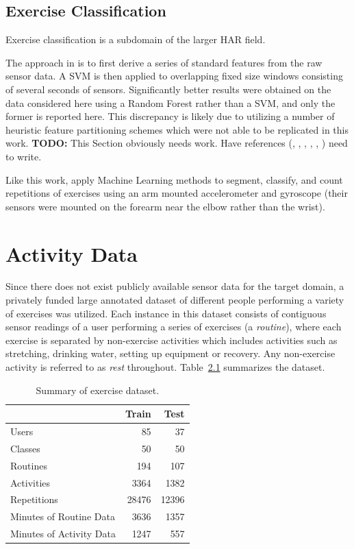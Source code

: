\documentclass[12pt]{report}
\newcommand{\1}[0]{\mathbbm{1}}
\begin{document}
\section{Exercise Classification}
Exercise classification is a subdomain of the larger \ac{HAR} field.

The approach in \cite{ms-activity} is to first derive a series of
standard features from the raw sensor data. A \ac{SVM} is then applied to overlapping
fixed size windows consisting of several seconds of sensors. Significantly better results were
obtained on the data considered here using a Random Forest rather than a \ac{SVM},
and only the former is reported here. This discrepancy is likely due to \cite{ms-activity}
utilizing a number of heuristic feature partitioning schemes which were not able to be replicated in this work.
\textbf{TODO:} This Section obviously needs work. Have references
(\cite{ms-overview},
\cite{arm-worn-muehlbauer},
\cite{phone-kwapisz},
\cite{weka-aaai-ravi},
\cite{multiple-sensor-bao},
\cite{taylor-crbm-2006}) need to write.

Like this work, \cite{ms-activity} apply Machine Learning methods to segment, classify, and count repetitions
of exercises using an arm mounted accelerometer and gyroscope (their sensors were mounted on the forearm
near the elbow rather than the wrist).

\chapter{Activity Data}
\label{chap:Activity Data}
Since there does not exist publicly available sensor data for the target domain, a privately funded
large annotated dataset of different people performing a variety of exercises was utilized.
Each instance in this dataset consists of contiguous sensor readings of a user performing a
series of exercises (a \emph{routine}), where each exercise is separated by non-exercise activities
which includes activities such as stretching, drinking water, setting up  equipment or recovery.
Any non-exercise activity is referred to as \emph{rest} throughout. Table~\ref{table:dataset} summarizes
the dataset.

\begin{table}[ht]
    \centering
    \begin{tabular}{l r r}\hline
    & \textbf{Train} &\textbf{Test} \\\hline
    Users & 85 & 37\\
    Classes & 50 & 50\\
    Routines & 194 & 107\\
    Activities & 3364 & 1382\\
    Repetitions & 28476 & 12396\\
    Minutes of Routine Data & 3636 & 1357\\
    Minutes of Activity Data & 1247 & 557\\
    \end{tabular}
    \caption[Summary of exercise dataset]{Summary of exercise dataset.}
    \label{table:dataset}
\end{table}
\end{document}
